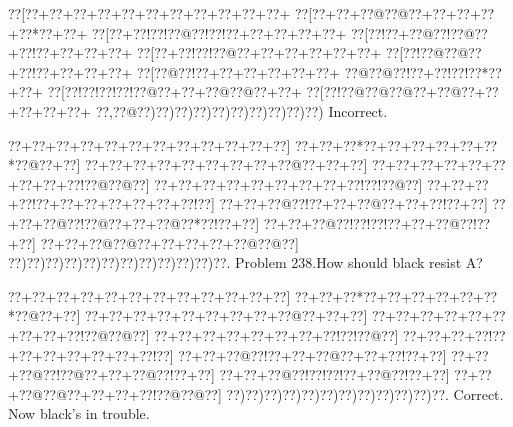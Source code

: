 \documentclass[a5paper]{article}
\begin{document}
\begin{center}
{\goo
\0??[\0??+\0??+\0??+\0??+\0??+\0??+\0??+\0??+\0??+\0??+\0??+
\0??[\0??+\0??+\0??@\0??@\0??+\0??+\0??+\0??+\0??*\0??+\0??+
\0??[\0??+\0??!\0??!\0??@\0??!\0??!\0??+\0??+\0??+\0??+\0??+
\0??[\0??!\0??+\0??@\0??!\0??@\0??+\0??!\0??+\0??+\0??+\0??+
\0??[\0??+\0??!\0??!\0??@\0??+\0??+\0??+\0??+\0??+\0??+
\0??[\0??!\0??@\0??@\0??+\0??!\0??+\0??+\0??+\0??+
\0??[\0??@\0??!\0??+\0??+\0??+\0??+\0??+\0??+
\0??@\0??@\0??!\0??+\0??!\0??!\0??*\0??+\0??+
\0??[\0??!\0??!\0??!\0??!\0??@\0??+\0??+\0??@\0??@\0??+\0??+
\0??[\0??!\0??@\0??@\0??@\0??+\0??@\0??+\0??+\0??+\0??+\0??+
\0??,\0??@\0??)\0??)\0??)\0??)\0??)\0??)\0??)\0??)\0??)\0??)
}
Incorrect. 

\end{center}
\newpage
\begin{center}
{\goo
\0??+\0??+\0??+\0??+\0??+\0??+\0??+\0??+\0??+\0??+\0??+\0??]
\0??+\0??+\0??*\0??+\0??+\0??+\0??+\0??+\0??*\0??@\0??+\0??]
\0??+\0??+\0??+\0??+\0??+\0??+\0??+\0??+\0??@\0??+\0??+\0??]
\0??+\0??+\0??+\0??+\0??+\0??+\0??+\0??+\0??!\0??@\0??@\0??]
\0??+\0??+\0??+\0??+\0??+\0??+\0??+\0??+\0??!\0??!\0??@\0??]
\0??+\0??+\0??+\0??!\0??+\0??+\0??+\0??+\0??+\0??+\0??!\0??]
\0??+\0??+\0??@\0??!\0??+\0??+\0??@\0??+\0??+\0??!\0??+\0??]
\0??+\0??+\0??@\0??!\0??@\0??+\0??+\0??@\0??*\0??!\0??+\0??]
\0??+\0??+\0??@\0??!\0??!\0??!\0??+\0??+\0??@\0??!\0??+\0??]
\0??+\0??+\0??@\0??@\0??+\0??+\0??+\0??+\0??@\0??@\0??]
\0??)\0??)\0??)\0??)\0??)\0??)\0??)\0??)\0??)\0??)\0??)\0??.
}
Problem 238.How should black resist A?

\end{center}
\begin{center}
{\goo
\0??+\0??+\0??+\0??+\0??+\0??+\0??+\0??+\0??+\0??+\0??+\0??]
\0??+\0??+\0??*\0??+\0??+\0??+\0??+\0??+\0??*\0??@\0??+\0??]
\0??+\0??+\0??+\0??+\0??+\0??+\0??+\0??+\0??@\0??+\0??+\0??]
\0??+\0??+\0??+\0??+\0??+\0??+\0??+\0??+\0??!\0??@\0??@\0??]
\0??+\0??+\0??+\0??+\0??+\0??+\0??+\0??!\0??!\0??@\0??]
\0??+\0??+\0??+\0??!\0??+\0??+\0??+\0??+\0??+\0??+\0??!\0??]
\0??+\0??+\0??@\0??!\0??+\0??+\0??@\0??+\0??+\0??!\0??+\0??]
\0??+\0??+\0??@\0??!\0??@\0??+\0??+\0??@\0??!\0??+\0??]
\0??+\0??+\0??@\0??!\0??!\0??!\0??+\0??@\0??!\0??+\0??]
\0??+\0??+\0??@\0??@\0??+\0??+\0??+\0??!\0??@\0??@\0??]
\0??)\0??)\0??)\0??)\0??)\0??)\0??)\0??)\0??)\0??)\0??)\0??.
}
Correct. Now black's in trouble.

\end{center}
\end{document}
